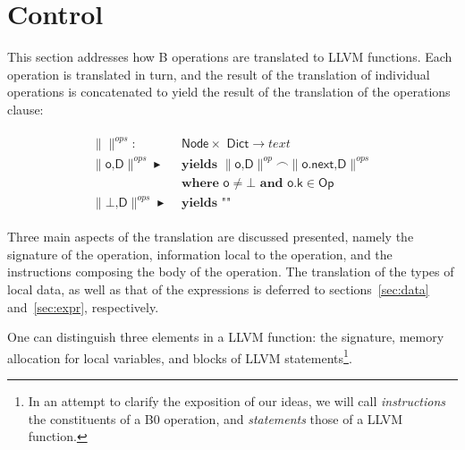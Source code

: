 \documentclass{article}
\newcommand{\trad}[2]{\ensuremath{\lVert \textsf{#1} \rVert^{\textit{#2}}}}
\newcommand{\mty}[0]{\texttt{""}}
\DeclareMathOperator{\conc}{\smallfrown}
\DeclareMathOperator{\isdef}{\blacktriangleright}
\begin{document}
\section{Control}
\label{sec:control}

This section addresses how B operations are translated to LLVM
functions. Each operation is translated in turn, and the result of
the translation of individual operations is concatenated to yield the
result of the translation of the operations clause:
\begin{framed}
\begin{align}
  \begin{split}
  \trad{}{ops} : & \textsf{ Node} \times \textsf{ Dict} \rightarrow text \\
  \trad{o,D}{ops} \isdef 
  & \textbf{ yields } \trad{o,D}{op} \conc \trad{o.next,D}{ops}  \\
  & \textbf{ where } \textsf{o} \neq \bot  \textbf{ and } \textsf{o.k} \in \textsf{Op}  \\
  \trad{$\bot$,D}{ops} \isdef
  & \textbf{ yields } \mty 
  \end{split}
\end{align}
\end{framed}

Three main aspects of the translation are discussed presented, namely
the signature of the operation, information local to the operation,
and the instructions composing the body of the operation. The
translation of the types of local data, as well as that of the
expressions is deferred to sections~\ref{sec:data} and~\ref{sec:expr},
respectively.

One can distinguish three elements in a LLVM function: the signature,
memory allocation for local variables, and blocks of LLVM
statements\footnote{In an attempt to clarify the exposition of our
  ideas, we will call \emph{instructions} the constituents of a B0
  operation, and \emph{statements} those of a LLVM function.}.
\end{document}
